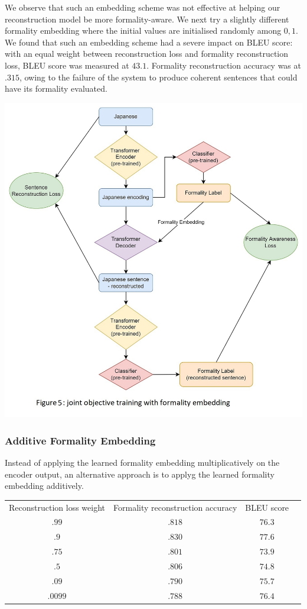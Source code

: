 \documentclass[11pt]{article}
\begin{document}
We observe that such an embedding scheme was not effective at helping our reconstruction model be more formality-aware. We next try a slightly different formality embedding where the initial values are initialised randomly among ${0, 1}$. We found that such an embedding scheme had a severe impact on BLEU score: with an equal weight between reconstruction loss and formality reconstruction loss, BLEU score was measured at $43.1$. Formality reconstruction accuracy was at $.315$, owing to the failure of the system to produce coherent sentences that could have its formality evaluated. 

\includegraphics{images/arch.jpg}

\subsubsection{Additive Formality Embedding}

Instead of applying the learned formality embedding multiplicatively on the encoder output, an alternative approach is to applyg the learned formality embedding additively. 

\begin{tabular}{ c c c c }
    Reconstruction loss weight & Formality reconstruction accuracy & BLEU score \\
    $.99$ & $.818$ & $76.3$ \\
    $.9$ & $.830$ & $77.6$ \\
    $.75$ & $.801$ & $73.9$ \\
    $.5$ & $.806$ & $74.8$ \\
    $.09$ & $.790$ & $75.7$ \\
    $.0099$ & $.788$ & $76.4$ \\
\end{tabular}
\end{document}
